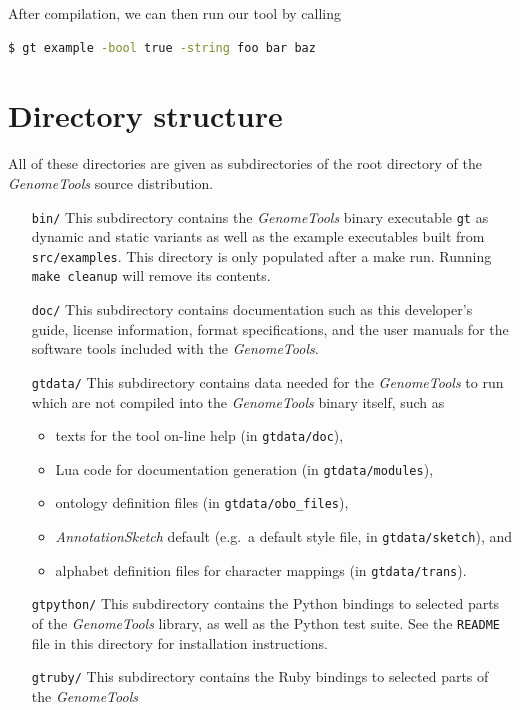 \documentclass[11pt,final]{article}
\newcommand{\Gt}[0]{\emph{GenomeTools}\xspace}
\begin{document}
After compilation, we can then run our tool by calling

\begin{lstlisting}[language=sh]
$ gt example -bool true -string foo bar baz
\end{lstlisting}%

\section{Directory structure}
All of these directories are given as subdirectories of the root directory of
the \Gt source distribution. 
\begin{itemize}
\item[\texttt{bin/}] This subdirectory contains the \Gt binary executable \texttt{gt}
     as dynamic and static variants as well as the example executables built
     from \texttt{src/examples}. This directory is only populated after a
     make run. Running \texttt{make cleanup} will remove its contents.
\item[\texttt{doc/}] This subdirectory contains documentation such as this
     developer's guide, license information, format specifications, and the
     user manuals for the software tools included with the \Gt .
\item[\texttt{gtdata/}]
     This subdirectory contains data needed for the \Gt to run which are not
     compiled into the \Gt binary itself, such as
     \begin{itemize}
       \item texts for the tool on-line help (in \texttt{gtdata/doc}),
       \item Lua code for documentation generation (in \texttt{gtdata/modules}),
       \item ontology definition files (in \texttt{gtdata/obo\_files}),
       \item \emph{AnnotationSketch} default (e.g.\ a default style file, in
              \texttt{gtdata/sketch}), and
       \item alphabet definition files for character mappings
             (in \texttt{gtdata/trans}).
     \end{itemize}     
\item[\texttt{gtpython/}]
     This subdirectory contains the Python bindings to selected parts of the \Gt
     library, as well as the Python test suite. See the \texttt{README} file in
     this directory for installation instructions.
\item[\texttt{gtruby/}]
     This subdirectory contains the Ruby bindings to selected parts of the \Gt

\end{itemize}
\end{document}
